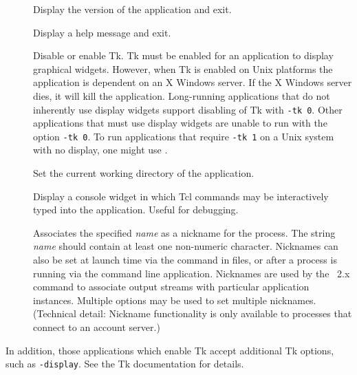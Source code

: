 \begin{description}
\item[]
Display the version of the application and exit.

\item[]
Display a help message and exit.

\item[]
Disable or enable Tk.  Tk must be enabled for an application to display
graphical widgets.  However, when Tk is enabled on Unix platforms
the application is dependent on an X Windows server.  If the 
X Windows server dies, it will kill the application.  Long-running
applications that do not inherently use display widgets support
disabling of Tk with \verb+-tk 0+.  
Other applications that must use display widgets are unable to run
with the option \verb+-tk 0+.  To run applications that require
\verb+-tk 1+ on a Unix system with no display, one might use
.

\item[]
Set the current working directory of the application.

\item[]
Display a console widget in which Tcl
commands may be interactively typed into the application.
Useful for debugging.

\item[]
Associates the specified \textit{name} as a nickname for the process.
The string \textit{name} should contain at least one non-numeric
character.  Nicknames can also be set at launch time via the
 command in  files, or
after a process is running via the
command line application.  Nicknames are used by the \MIF\ 2.x
 command to associate  output streams with
particular application instances.  Multiple  options may
be used to set multiple nicknames.  (Technical detail: Nickname
functionality is only available to processes that connect to an
account server.)
\end{description}

In addition, those applications which enable Tk accept additional Tk
options, such as \verb+-display+.  See the Tk documentation for details.

